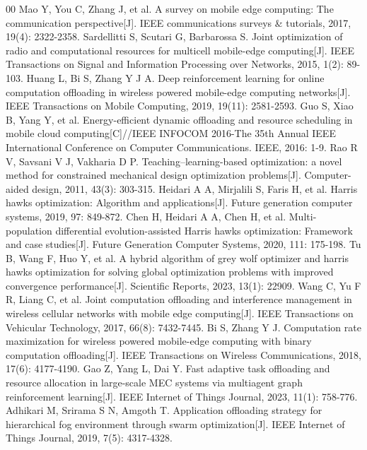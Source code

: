 \documentclass[conference]{IEEEtran}
\begin{document}
\begin{thebibliography}{00}
 Mao Y, You C, Zhang J, et al. A survey on mobile edge computing: The communication perspective[J]. IEEE communications surveys & tutorials, 2017, 19(4): 2322-2358.
 Sardellitti S, Scutari G, Barbarossa S. Joint optimization of radio and computational resources for multicell mobile-edge computing[J]. IEEE Transactions on Signal and Information Processing over Networks, 2015, 1(2): 89-103.
 Huang L, Bi S, Zhang Y J A. Deep reinforcement learning for online computation offloading in wireless powered mobile-edge computing networks[J]. IEEE Transactions on Mobile Computing, 2019, 19(11): 2581-2593.
 Guo S, Xiao B, Yang Y, et al. Energy-efficient dynamic offloading and resource scheduling in mobile cloud computing[C]//IEEE INFOCOM 2016-The 35th Annual IEEE International Conference on Computer Communications. IEEE, 2016: 1-9.
 Rao R V, Savsani V J, Vakharia D P. Teaching–learning-based optimization: a novel method for constrained mechanical design optimization problems[J]. Computer-aided design, 2011, 43(3): 303-315.
 Heidari A A, Mirjalili S, Faris H, et al. Harris hawks optimization: Algorithm and applications[J]. Future generation computer systems, 2019, 97: 849-872.
Chen H, Heidari A A, Chen H, et al. Multi-population differential evolution-assisted Harris hawks optimization: Framework and case studies[J]. Future Generation Computer Systems, 2020, 111: 175-198.
 Tu B, Wang F, Huo Y, et al. A hybrid algorithm of grey wolf optimizer and harris hawks optimization for solving global optimization problems with improved convergence performance[J]. Scientific Reports, 2023, 13(1): 22909.
 Wang C, Yu F R, Liang C, et al. Joint computation offloading and interference management in wireless cellular networks with mobile edge computing[J]. IEEE Transactions on Vehicular Technology, 2017, 66(8): 7432-7445.
 Bi S, Zhang Y J. Computation rate maximization for wireless powered mobile-edge computing with binary computation offloading[J]. IEEE Transactions on Wireless Communications, 2018, 17(6): 4177-4190.
 Gao Z, Yang L, Dai Y. Fast adaptive task offloading and resource allocation in large-scale MEC systems via multiagent graph reinforcement learning[J]. IEEE Internet of Things Journal, 2023, 11(1): 758-776.
 Adhikari M, Srirama S N, Amgoth T. Application offloading strategy for hierarchical fog environment through swarm optimization[J]. IEEE Internet of Things Journal, 2019, 7(5): 4317-4328.

\end{thebibliography}
\end{document}

